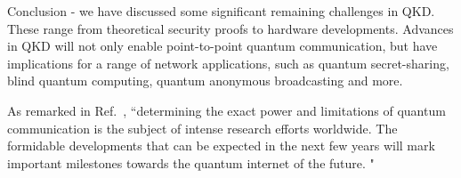 Conclusion - we have discussed some significant remaining challenges in QKD.
These range from theoretical security proofs to hardware developments.
Advances in QKD will not only enable point-to-point quantum communication,
but have implications for a range of network applications, such as
quantum secret-sharing\cite{cleve1999share,PhysRevA.61.042311,PhysRevA.71.044301}, blind quantum computing\cite{broadbent2009universal,barz2012demonstration}, quantum anonymous
broadcasting\cite{christandl2005quantum} and more.

As remarked in Ref.~\cite{diamanti2016practical},
``determining the exact power and limitations of quantum
communication is the subject of intense research efforts worldwide.
The formidable developments that can be expected in the
next few years will mark important milestones towards the
quantum internet of the future. "  


